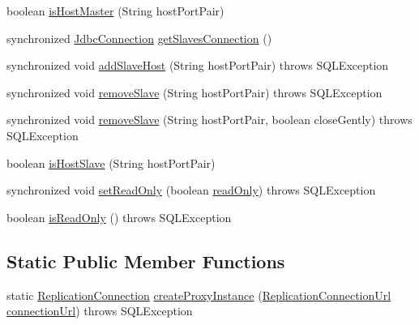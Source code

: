 \begin{DoxyCompactItemize}
\item 
boolean \mbox{\hyperlink{classcom_1_1mysql_1_1cj_1_1jdbc_1_1ha_1_1_replication_connection_proxy_a37155ee36d2c99c592a7095a73983833}{is\+Host\+Master}} (String host\+Port\+Pair)
\item 
synchronized \mbox{\hyperlink{interfacecom_1_1mysql_1_1cj_1_1jdbc_1_1_jdbc_connection}{Jdbc\+Connection}} \mbox{\hyperlink{classcom_1_1mysql_1_1cj_1_1jdbc_1_1ha_1_1_replication_connection_proxy_a8b165198e76f881febc7d965995b9c86}{get\+Slaves\+Connection}} ()
\item 
synchronized void \mbox{\hyperlink{classcom_1_1mysql_1_1cj_1_1jdbc_1_1ha_1_1_replication_connection_proxy_ac174913fdb2b32fe94ff30a17fdee529}{add\+Slave\+Host}} (String host\+Port\+Pair)  throws S\+Q\+L\+Exception 
\item 
synchronized void \mbox{\hyperlink{classcom_1_1mysql_1_1cj_1_1jdbc_1_1ha_1_1_replication_connection_proxy_af9a57c012a15d412e468cdb1c6e2d5b6}{remove\+Slave}} (String host\+Port\+Pair)  throws S\+Q\+L\+Exception 
\item 
synchronized void \mbox{\hyperlink{classcom_1_1mysql_1_1cj_1_1jdbc_1_1ha_1_1_replication_connection_proxy_a2635263e50bdfb575b21f1f03137902c}{remove\+Slave}} (String host\+Port\+Pair, boolean close\+Gently)  throws S\+Q\+L\+Exception 
\item 
boolean \mbox{\hyperlink{classcom_1_1mysql_1_1cj_1_1jdbc_1_1ha_1_1_replication_connection_proxy_a472e2e5ad87da8c7f7129613e1bf2479}{is\+Host\+Slave}} (String host\+Port\+Pair)
\item 
synchronized void \mbox{\hyperlink{classcom_1_1mysql_1_1cj_1_1jdbc_1_1ha_1_1_replication_connection_proxy_ad89a48fce7262137c4db844d6c6838a3}{set\+Read\+Only}} (boolean \mbox{\hyperlink{classcom_1_1mysql_1_1cj_1_1jdbc_1_1ha_1_1_replication_connection_proxy_aed908cc85582ecb990209d20ff83e2b0}{read\+Only}})  throws S\+Q\+L\+Exception 
\item 
boolean \mbox{\hyperlink{classcom_1_1mysql_1_1cj_1_1jdbc_1_1ha_1_1_replication_connection_proxy_a8fd0fe1c0d5dea93f38cc0105e1899ab}{is\+Read\+Only}} ()  throws S\+Q\+L\+Exception 
\end{DoxyCompactItemize}
\subsection*{Static Public Member Functions}
\begin{DoxyCompactItemize}
\item 
static \mbox{\hyperlink{interfacecom_1_1mysql_1_1cj_1_1jdbc_1_1ha_1_1_replication_connection}{Replication\+Connection}} \mbox{\hyperlink{classcom_1_1mysql_1_1cj_1_1jdbc_1_1ha_1_1_replication_connection_proxy_ae2b51d44466e63adbc4f963f0d4739d7}{create\+Proxy\+Instance}} (\mbox{\hyperlink{classcom_1_1mysql_1_1cj_1_1conf_1_1url_1_1_replication_connection_url}{Replication\+Connection\+Url}} \mbox{\hyperlink{classcom_1_1mysql_1_1cj_1_1jdbc_1_1ha_1_1_multi_host_connection_proxy_aae3d1ff31056ba5a6686ce6e692a64a8}{connection\+Url}})  throws S\+Q\+L\+Exception 
\end{DoxyCompactItemize}
